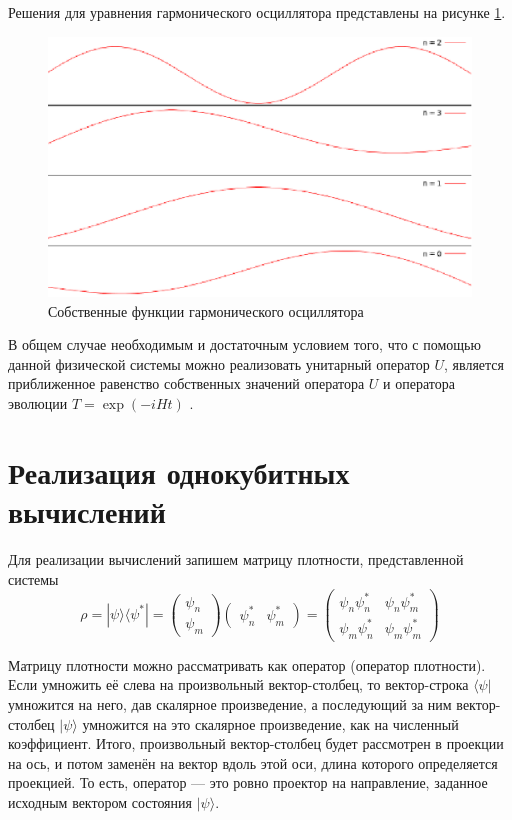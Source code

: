 \documentclass[14pt,a4paper]{PhDthesis}
\begin{document}
Решения для уравнения гармонического осциллятора представлены на рисунке \ref{ris:kk1}.
\begin{figure}[h]
\centering\includegraphics[width=.50\textwidth]{images/function.eps}
\caption{Собственные функции гармонического осциллятора}\label{ris:kk1}
\end{figure}

В общем случае необходимым и достаточным условием того, что с помощью данной физической системы можно реализовать унитарный оператор $U$, является
приближенное равенство собственных значений оператора $U$ и оператора эволюции $T = \exp(-iHt)$ \cite{Menskiy:2001ru}.

\section{Реализация однокубитных вычислений}
Для реализации вычислений запишем матрицу плотности, представленной системы
\begin{equation}
\rho = |\psi\rangle\langle\psi^{*}| = \begin{pmatrix} \psi_{n}\\
 						\psi_{m}
 		\end{pmatrix} \begin{pmatrix}\psi^{*}_{n} & \psi^{*}_{m}\end{pmatrix}  = \begin{pmatrix} \psi_{n}\psi^{*}_{n} & \psi_{n}\psi^{*}_{m} \\ 
 																	 					\psi_{m}\psi^{*}_{n} & \psi_{m}\psi^{*}_{m} 		 																		 
 		 																		 \end{pmatrix}
\end{equation}

Матрицу плотности можно рассматривать как оператор (оператор плотности). Если умножить её слева на произвольный вектор-столбец, то вектор-строка $\langle\psi\rvert$ умножится на него, дав скалярное произведение, а последующий за ним вектор-столбец $\lvert\psi\rangle$ умножится на это скалярное произведение, как на численный коэффициент. Итого, произвольный вектор-столбец будет рассмотрен в проекции на ось, и потом заменён на вектор вдоль этой оси, длина которого определяется проекцией. То есть, оператор --- это ровно проектор на направление, заданное исходным вектором состояния $\lvert\psi\rangle.$
\end{document}
